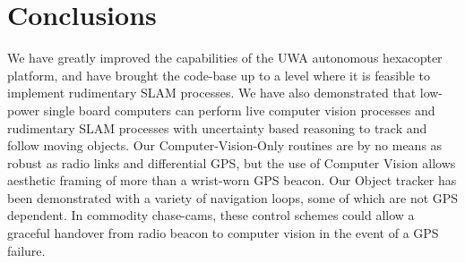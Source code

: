 \documentclass[a4paper, 11pt, titlepage]{article}
\begin{document}
\section{Conclusions}
  We have greatly improved the capabilities of the UWA autonomous hexacopter platform, and have brought the code-base up to a level where it is feasible to implement rudimentary SLAM processes.
  We have also demonstrated that low-power single board computers can perform live computer vision processes and rudimentary SLAM processes with uncertainty based reasoning to track and follow moving objects.
  Our Computer-Vision-Only routines are by no means as robust as radio links and differential GPS, but the use of Computer Vision allows aesthetic framing of more than a wrist-worn GPS beacon.
  Our Object tracker has been demonstrated with a variety of navigation loops, some of which are not GPS dependent.  In commodity chase-cams, these control schemes could allow a graceful handover from radio beacon to computer vision in the event of a GPS failure.




\renewcommand{\refname}{References}


%


\begin{appendices}
%    

\end{appendices}

  
\end{document}

